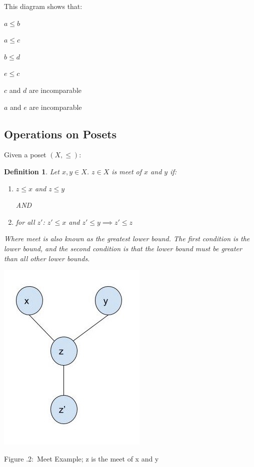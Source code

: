 \documentclass[twoside]{article}
\newcounter{lecnum}
\newcommand{\fig}[3]{
			\vspace{#2}
			\begin{center}
			Figure \thelecnum.#1:~#3
			\end{center}
	}
\newtheorem{definition}[theorem]{Definition}
\begin{document}
This diagram shows that:

$a \leq b$

$a \leq c$

$b \leq d$

$e \leq c$

$c$ and $d$ are incomparable

$a$ and $e$ are incomparable

\subsection{Operations on Posets}
Given a poset $(X, \leq)$:


\begin{definition}
Let $x,y \in X$. $z \in X$ is meet of $x$ and $y$ if:
\begin{enumerate}
    \item $z \leq x$ and $z \leq y$    
    
    AND
    \item for all $z'$: $z' \leq x$ and $z' \leq y \implies z' \leq z$
\end{enumerate}

Where meet is also known as the greatest lower bound. The first condition is the lower bound, and the second condition is that the lower bound must be greater than all other lower bounds.
\end{definition} 

\begin{minipage}[]{\textwidth}
\centering
\includegraphics[width=.5\textwidth]{meet.jpg}
\end{minipage}
\fig{2}{0cm}{Meet Example; z is the meet of x and y}
\end{document}
